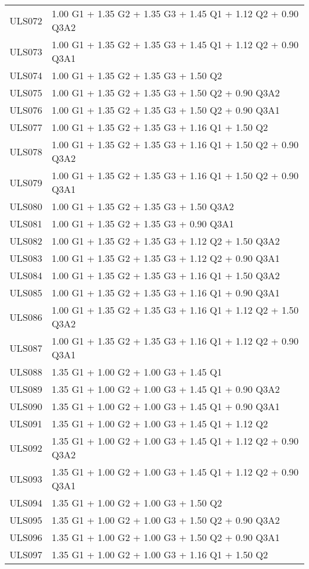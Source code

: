 \begin{center}
\begin{small}
\begin{longtable}{|l|p{10cm}|}
ULS072 & 1.00 G1 + 1.35 G2 + 1.35 G3 + 1.45 Q1 + 1.12 Q2 + 0.90 Q3A2\\
ULS073 & 1.00 G1 + 1.35 G2 + 1.35 G3 + 1.45 Q1 + 1.12 Q2 + 0.90 Q3A1\\
ULS074 & 1.00 G1 + 1.35 G2 + 1.35 G3 + 1.50 Q2\\
ULS075 & 1.00 G1 + 1.35 G2 + 1.35 G3 + 1.50 Q2 + 0.90 Q3A2\\
ULS076 & 1.00 G1 + 1.35 G2 + 1.35 G3 + 1.50 Q2 + 0.90 Q3A1\\
ULS077 & 1.00 G1 + 1.35 G2 + 1.35 G3 + 1.16 Q1 + 1.50 Q2\\
ULS078 & 1.00 G1 + 1.35 G2 + 1.35 G3 + 1.16 Q1 + 1.50 Q2 + 0.90 Q3A2\\
ULS079 & 1.00 G1 + 1.35 G2 + 1.35 G3 + 1.16 Q1 + 1.50 Q2 + 0.90 Q3A1\\
ULS080 & 1.00 G1 + 1.35 G2 + 1.35 G3 + 1.50 Q3A2\\
ULS081 & 1.00 G1 + 1.35 G2 + 1.35 G3 + 0.90 Q3A1\\
ULS082 & 1.00 G1 + 1.35 G2 + 1.35 G3 + 1.12 Q2 + 1.50 Q3A2\\
ULS083 & 1.00 G1 + 1.35 G2 + 1.35 G3 + 1.12 Q2 + 0.90 Q3A1\\
ULS084 & 1.00 G1 + 1.35 G2 + 1.35 G3 + 1.16 Q1 + 1.50 Q3A2\\
ULS085 & 1.00 G1 + 1.35 G2 + 1.35 G3 + 1.16 Q1 + 0.90 Q3A1\\
ULS086 & 1.00 G1 + 1.35 G2 + 1.35 G3 + 1.16 Q1 + 1.12 Q2 + 1.50 Q3A2\\
ULS087 & 1.00 G1 + 1.35 G2 + 1.35 G3 + 1.16 Q1 + 1.12 Q2 + 0.90 Q3A1\\
ULS088 & 1.35 G1 + 1.00 G2 + 1.00 G3 + 1.45 Q1\\
ULS089 & 1.35 G1 + 1.00 G2 + 1.00 G3 + 1.45 Q1 + 0.90 Q3A2\\
ULS090 & 1.35 G1 + 1.00 G2 + 1.00 G3 + 1.45 Q1 + 0.90 Q3A1\\
ULS091 & 1.35 G1 + 1.00 G2 + 1.00 G3 + 1.45 Q1 + 1.12 Q2\\
ULS092 & 1.35 G1 + 1.00 G2 + 1.00 G3 + 1.45 Q1 + 1.12 Q2 + 0.90 Q3A2\\
ULS093 & 1.35 G1 + 1.00 G2 + 1.00 G3 + 1.45 Q1 + 1.12 Q2 + 0.90 Q3A1\\
ULS094 & 1.35 G1 + 1.00 G2 + 1.00 G3 + 1.50 Q2\\
ULS095 & 1.35 G1 + 1.00 G2 + 1.00 G3 + 1.50 Q2 + 0.90 Q3A2\\
ULS096 & 1.35 G1 + 1.00 G2 + 1.00 G3 + 1.50 Q2 + 0.90 Q3A1\\
ULS097 & 1.35 G1 + 1.00 G2 + 1.00 G3 + 1.16 Q1 + 1.50 Q2\\

\end{longtable}
\end{small}
\end{center}
